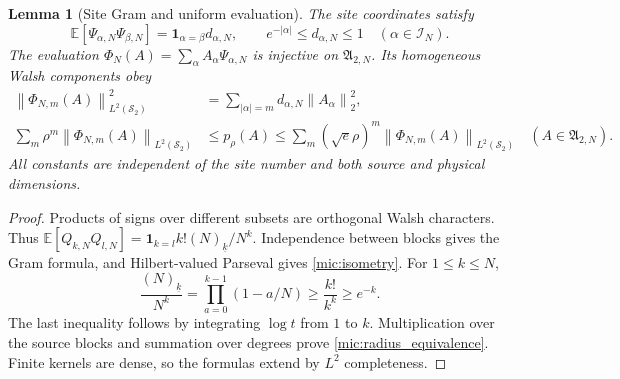 \documentclass[11pt,a4paper]{amsart}
\numberwithin{equation}{section}
\newtheorem{lemma}[theorem]{Lemma}
\theoremstyle{definition}
\theoremstyle{remark}
\newcommand{\E}{\mathbb E}
\newcommand{\Sch}{\mathcal S}
\newcommand{\Alg}{\mathfrak A}
\newcommand{\norm}[1]{\left\lVert#1\right\rVert}
\begin{document}
\begin{lemma}[Site Gram and uniform evaluation]\label{mic:gram}
The site coordinates satisfy
\begin{equation}\label{mic:orthogonality}
 \E[\Psi_{\alpha,N}\Psi_{\beta,N}]
   =\mathbf1_{\alpha=\beta}d_{\alpha,N},\qquad
 e^{-|\alpha|}\le d_{\alpha,N}\le1\quad(\alpha\in\mathcal I_N).
\end{equation}
The evaluation $\Phi_N(A)=\sum_\alpha A_\alpha\Psi_{\alpha,N}$ is injective on $\Alg_{2,N}$. Its homogeneous Walsh components obey
\begin{align}
 \norm{\Phi_{N,m}(A)}_{L^2(\Sch_2)}^2
 &=\sum_{|\alpha|=m}d_{\alpha,N}\norm{A_\alpha}_2^2,\label{mic:isometry}\\
 \sum_m\rho^m\norm{\Phi_{N,m}(A)}_{L^2(\Sch_2)}
 &\le p_\rho(A)
 \le\sum_m(\sqrt e\rho)^m\norm{\Phi_{N,m}(A)}_{L^2(\Sch_2)}
 \quad(A\in\Alg_{2,N}).\label{mic:radius_equivalence}
\end{align}
All constants are independent of the site number and both source and physical dimensions.
\end{lemma}
\begin{proof}
Products of signs over different subsets are orthogonal Walsh characters. Thus
$\E[Q_{k,N}Q_{l,N}]=\mathbf1_{k=l}k!(N)_{\underline k}/N^k$.
Independence between blocks gives the Gram formula, and Hilbert-valued Parseval gives \eqref{mic:isometry}. For $1\le k\le N$,
\[
 \frac{(N)_{\underline k}}{N^k}
 =\prod_{a=0}^{k-1}(1-a/N)\ge\frac{k!}{k^k}\ge e^{-k}.
\]
The last inequality follows by integrating $\log t$ from $1$ to $k$. Multiplication over the source blocks and summation over degrees prove \eqref{mic:radius_equivalence}. Finite kernels are dense, so the formulas extend by $L^2$ completeness.
\end{proof}
\end{document}

